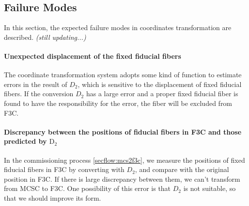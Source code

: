 \subsection{Failure Modes}\label{sec:failures}
In this section, the expected failure modes in coordinates transformation are described.
{\it (still updating...)}

\paragraph{Unexpected displacement of the fixed fiducial fibers}
The coordinate transformation system adopts some kind of function to estimate errors in the result of $D_2$, which is sensitive to the displacement of fixed fiducial fibers.
If the conversion $D_2$ has a large error and a proper fixed fiducial fiber is found to have the responsibility for the error, the fiber will be excluded from F3C.

\paragraph{Discrepancy between the positions of fiducial fibers in F3C and those predicted by $\mathrm{D_2}$}
In the commissioning process \ref{secflow:mcs2f3c}, we measure the positions of fixed fiducial fibers in F3C by converting with $D_2$, and compare with the original position in F3C.
If there is large discrepancy between them, we can't transform from MCSC to F3C.
One possibility of this error is that $D_2$ is not suitable, so that we should improve its form.


